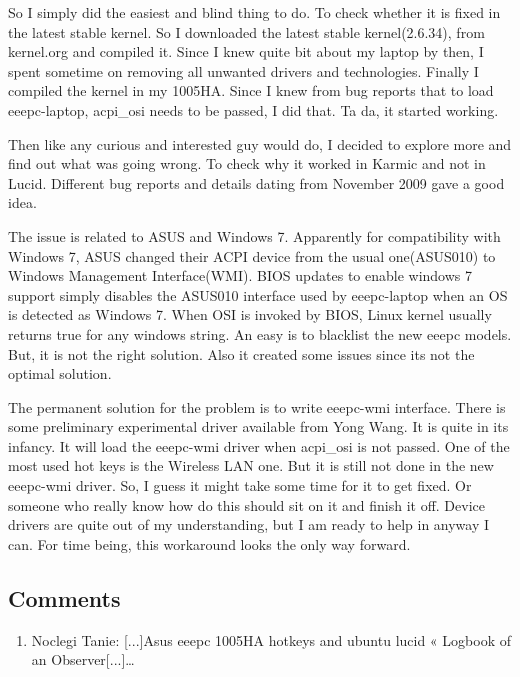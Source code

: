 So I simply did the easiest and blind thing to do. To check whether it is fixed in the latest stable kernel. So I downloaded the latest stable kernel(2.6.34), from kernel.org and compiled it. Since I knew quite bit about my laptop by then, I spent sometime on removing all unwanted drivers and technologies. Finally I compiled the kernel in my 1005HA. Since I knew from bug reports that to load eeepc-laptop, acpi\_osi needs to be passed, I did that. Ta da,  it started working.

Then like any curious and interested guy would do, I decided to explore more and find out what was going wrong. To check why it worked in Karmic and not in Lucid. Different bug reports and details dating from November 2009 gave a good idea.

The issue is related to ASUS and Windows 7. Apparently for compatibility with Windows 7, ASUS changed their ACPI device from the usual one(ASUS010) to Windows Management Interface(WMI). BIOS updates to enable windows 7 support simply disables the ASUS010 interface used by eeepc-laptop when an OS is detected as Windows 7. When OSI is invoked by BIOS, Linux kernel usually returns true for any windows string. An easy is to blacklist the new eeepc models. But, it is not the right solution. Also it created some issues since its not the optimal solution.

The permanent solution for the problem is to write eeepc-wmi interface. There is some preliminary experimental driver available from Yong Wang. It is quite in its infancy. It will load the eeepc-wmi driver when acpi\_osi is not passed. One of the most used hot keys is the Wireless LAN one. But it is still not done in the new eeepc-wmi driver. So, I guess it might take some time for it to get fixed. Or someone who really know how do this should sit on it and finish it off. Device drivers are quite out of my understanding, but I am ready to help in anyway I can. For time being, this workaround looks the only way forward.


\subsection{Comments}
\begin{enumerate}
 \item Noclegi Tanie: 
[...]Asus eeepc 1005HA hotkeys and ubuntu lucid « Logbook of an Observer[...]…
\end{enumerate}

\newpage 
